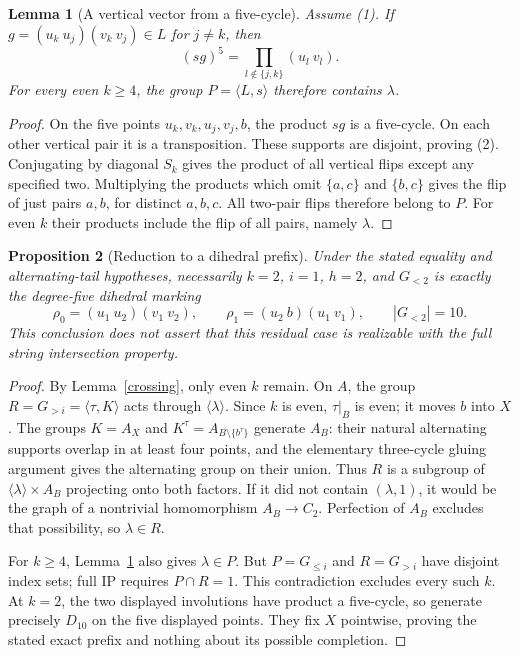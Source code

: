 \documentclass[11pt,a4paper]{article}
\newtheorem{lemma}{Lemma}
\newtheorem{proposition}[lemma]{Proposition}
\newcommand{\gen}[1]{\langle#1\rangle}
\begin{document}
\begin{lemma}[A vertical vector from a five-cycle]\label{vector}
Assume (1). If $g=(u_k\ u_j)(v_k\ v_j)\in L$ for $j\ne k$,
then
\[
                     (s g)^5=\prod_{l\notin\{j,k\}}(u_l\ v_l).
                                                               \tag{2}
\]
For every even $k\geq4$, the group $P=\gen{L,s}$ therefore
contains $\lambda$.
\end{lemma}
\begin{proof}
On the five points $u_k,v_k,u_j,v_j,b$, the product $s g$ is
a five-cycle. On each other vertical pair it is a transposition.
These supports are disjoint, proving (2). Conjugating by diagonal
$S_k$ gives the product of all vertical flips except any specified
two. Multiplying the products which omit $\{a,c\}$ and
$\{b,c\}$ gives the flip of just pairs $a,b$, for distinct
$a,b,c$. All two-pair flips therefore belong to $P$.
For even $k$ their products include the flip of all pairs,
namely $\lambda$.
\end{proof}

\begin{proposition}[Reduction to a dihedral prefix]
Under the stated equality and alternating-tail hypotheses,
necessarily $k=2$, $i=1$, $h=2$, and $G_{<2}$ is exactly the
degree-five dihedral marking
\[
 \rho_0=(u_1\ u_2)(v_1\ v_2),\qquad
 \rho_1=(u_2\ b)(u_1\ v_1),\qquad |G_{<2}|=10.
\]
This conclusion does not assert that this residual case is
realizable with the full string intersection property.
\end{proposition}
\begin{proof}
By Lemma~\ref{crossing}, only even $k$ remain. On $A$, the
group $R=G_{>i}=\gen{\tau,K}$ acts through $\gen\lambda$.
Since $k$ is even, $\tau|_B$ is even; it moves $b$ into $X$.
The groups $K=A_X$ and $K^\tau=A_{B\setminus\{b^\tau\}}$
generate $A_B$: their natural alternating supports overlap
in at least four points, and the elementary three-cycle gluing
argument gives the alternating group on their union.
Thus $R$ is a subgroup of $\gen\lambda\times A_B$ projecting
onto both factors. If it did not contain $(\lambda,1)$, it
would be the graph of a nontrivial homomorphism $A_B\to C_2$.
Perfection of $A_B$ excludes that possibility, so $\lambda\in R$.

For $k\geq4$, Lemma~\ref{vector} also gives $\lambda\in P$.
But $P=G_{\leq i}$ and $R=G_{>i}$ have disjoint index sets;
full IP requires $P\cap R=1$. This contradiction excludes every
such $k$. At $k=2$, the two displayed involutions have product
a five-cycle, so generate precisely $D_{10}$ on the five
displayed points. They fix $X$ pointwise, proving the stated
exact prefix and nothing about its possible completion.
\end{proof}
\end{document}
